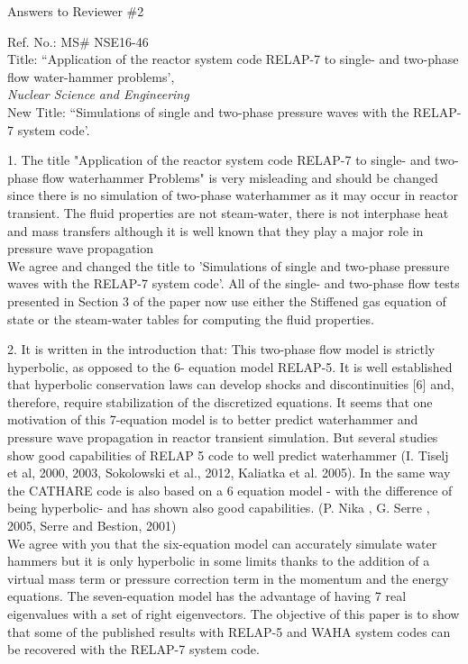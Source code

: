 \documentclass{article}
\begin{document}
\begin{center}
{ \Large Answers to Reviewer \#2}
\end{center}

\bigskip

\noindent Ref. No.: MS\# NSE16-46\\
Title: ``Application of the reactor system code RELAP-7 to single- and two-phase flow water-hammer problems', \\
{\it Nuclear Science and Engineering}\\
New Title: ``Simulations of single and two-phase pressure waves with the RELAP-7 system code'.

\bigskip
\bigskip

{\color{blue}
1. The title "Application of the reactor system code RELAP-7 to single- and two-phase flow waterhammer Problems" is very misleading and should be changed since there is no simulation of two-phase waterhammer as it may occur in reactor transient. The fluid properties are not steam-water, there is not interphase heat and mass transfers although it is well known that they play a major role in pressure wave propagation
\\}
We agree and changed the title to 'Simulations of single and two-phase pressure waves with the RELAP-7 system code'. All of the single- and two-phase flow tests presented in Section 3 of the paper now use either the Stiffened gas equation of state or the steam-water tables for computing the fluid properties.
\bigskip

{\color{blue}
2. It is written in the introduction that:
This two-phase flow model is strictly hyperbolic, as opposed to the 6- equation model RELAP-5. It is well established that hyperbolic conservation laws can develop shocks and discontinuities [6] and, therefore, require stabilization of the discretized equations.
It seems that one motivation of this 7-equation model is to better predict waterhammer and pressure wave propagation in reactor transient simulation. But several studies show good capabilities of RELAP 5 code to well predict waterhammer (I. Tiselj et al, 2000, 2003, Sokolowski et al., 2012, Kaliatka et al. 2005). In the same way the CATHARE code is also based on a 6 equation model - with the difference of being hyperbolic- and has shown also good capabilities. (P. Nika , G. Serre , 2005, Serre and Bestion, 2001) \\
}
We agree with you that the six-equation model can accurately simulate water hammers but it is only hyperbolic in some limits thanks to the addition of a virtual mass term or pressure correction term in the momentum and the energy equations. The seven-equation model has the advantage of having 7 real eigenvalues with a set of right eigenvectors. The objective of this paper is to show that some of the published results with RELAP-5 and WAHA system codes can be recovered with the RELAP-7 system code.
\bigskip
\end{document}
